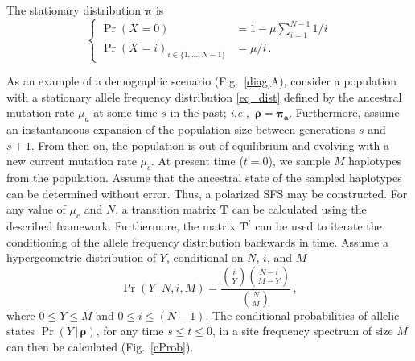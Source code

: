 \documentclass[preprint]{elsarticle}
\newcommand{\bs}[1]{\ensuremath{\boldsymbol{#1}}}
\newcommand\given{{\,|\,}}
\newcommand\ie{{\it i.e.,}}
\newcommand\x[1]{\ensuremath{X_{#1}}}
\newcommand\y{\ensuremath{Y}}
\begin{document}
The stationary distribution $\bs{\pi}$ is 
\begin{equation}\label{eq_dist}
\begin{cases}
\Pr(\x{}=0)&=1-\mu\sum_{i=1}^{N-1}1/i\\
\Pr(\x{}=i)_{i \in \{1, \ldots, N-1\}} &=\mu/i\,.
\end{cases}
\end{equation}

As an example of a demographic scenario (Fig.~\ref{diag}A), consider a population with a stationary allele frequency distribution \eqref{eq_dist} defined by the ancestral mutation rate $\mu_a$ at some time $s$ in the past; \ie\ $\bs{\rho} = \bs{\pi_a}$. Furthermore, assume an instantaneous expansion of the population size between generations $s$ and $s+1$. From then on, the population is out of equilibrium and evolving with a new current mutation rate $\mu_c$. At present time ($t=0$), 
we sample $M$ haplotypes from the population. Assume that the ancestral state of the sampled haplotypes can be determined without error. Thus, a polarized SFS may be constructed. For any value of $\mu_c$ and $N$, a transition matrix $\mathbf{T}$ can be calculated using the described framework. Furthermore, the matrix $\mathbf{T}^{'}$ can be used to iterate the conditioning of the allele frequency distribution backwards in time. Assume a hypergeometric distribution of $Y$, conditional on $N$, $i$, and $M$
\begin{equation}\label{X0}
\Pr(\y\given N,i,M)=\frac{\binom{i}{\y}\binom{N-i}{M-\y}}{\binom{N}{M}}\,,
\end{equation}
where $0\leq \y\leq M$ and $0\leq i\leq (N-1)$. The conditional probabilities of allelic states $\Pr(\y \given \bs{\rho})$, for any time $s\leq t\leq 0$, in a site frequency spectrum of size $M$ can then be calculated (Fig.~\ref{cProb}). %
\end{document}
